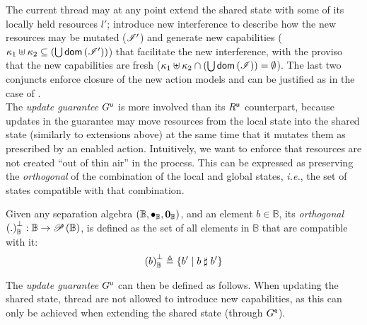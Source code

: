 %
The current thread may at any point extend the shared state with some of its locally held resources $l'$; introduce new interference to describe how the new resources may be mutated ($\mathscr{I}'$) and generate new capabilities ($\kappa_{1} \uplus \kappa_{2} \subseteq \left(\bigcup \textsf{dom}\left( \mathscr{I}' \right)\right)$) that facilitate the new interference, with the proviso that the new capabilities are fresh ($\kappa_{1} \uplus \kappa_{2}  \cap \left(\bigcup \textsf{dom}\left( \mathscr{I} \right)\right) = \emptyset$). The last two conjuncts enforce closure of the new action models and can be justified as in the case of \extendR.\\



The \emph{update guarantee} $G^{\textsf{u}}$ is more involved than its $R^{\textsf{u}}$ counterpart, because updates in the guarantee may move resources from the local state into the shared state (similarly to extensions above) at the same time that it mutates them as prescribed by an enabled action. Intuitively, we want to enforce that resources
are not created ``out of thin air'' in the process. This can be expressed as preserving the \emph{orthogonal} of the combination of the local and global states, \textit{i.e.}, the set of states compatible with that combination.
%
\begin{definition}[Orthogonal]\label{def:orthogonal}
Given any separation algebra $(\mathbb{B}, \bullet_{\mathbb{B}}, \mathbf{0}_{\mathbb{B}})$, and an element $b \in \mathbb{B}$, its \emph{orthogonal} $\left( .\right)_{\mathbb{B}}^{\bot} : \mathbb{B} \rightarrow \mathscr{P}\left(\mathbb{B} \right)$, is defined as the set of all elements in $\mathbb{B}$ that are compatible with it:
%
\[
	\left( b\right)_{\mathbb{B}}^{\bot} \triangleq \left\{ b' \mid b \mathrel{\sharp} b' \right\}
\]
\end{definition}
%
The \emph{update guarantee} $G^{\textsf{u}}$ can then be defined as follows. When updating the shared state, thread are not allowed to introduce new capabilities, as this can only be achieved when extending the shared state (through $G^{\textsf{e}}$).
%
